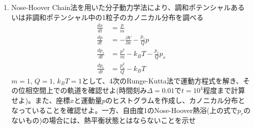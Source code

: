 \documentclass[11pt]{jarticle}
\begin{document}
\begin{enumerate}
\item Nose-Hoover Chain法を用いた分子動力学法により、調和ポテンシャルあるいは非調和ポテンシャル中の1粒子のカノニカル分布を調べる
  \begin{align*}
    \frac{dx}{dt} &= \frac{p}{m} \\
    \frac{dp}{dt} &= -\frac{\partial V}{\partial x} - \frac{p_s}{Q} p \\
    \frac{dp_s}{dt} &= \frac{p^2}{m} - k_B T - \frac{p_r}{Q} p_s \\
    \frac{dp_r}{dt} &= \frac{p_s^2}{Q} - k_B T
  \end{align*}
  $m=1$, $Q=1$, $k_BT=1$として、4次のRunge-Kutta法で運動方程式を解き、その位相空間上での軌道を確認せよ(時間刻み$\Delta=0.01$で$t=10^4$程度まで計算せよ)。また、座標$x$と運動量$p$のヒストグラムを作成し、カノニカル分布となっていることを確認せよ。一方、自由度1のNose-Hoover熱浴(上の式で$p_r$のないもの)の場合には、熱平衡状態とはならないことを示せ

  



  

\end{enumerate}
\end{document}
